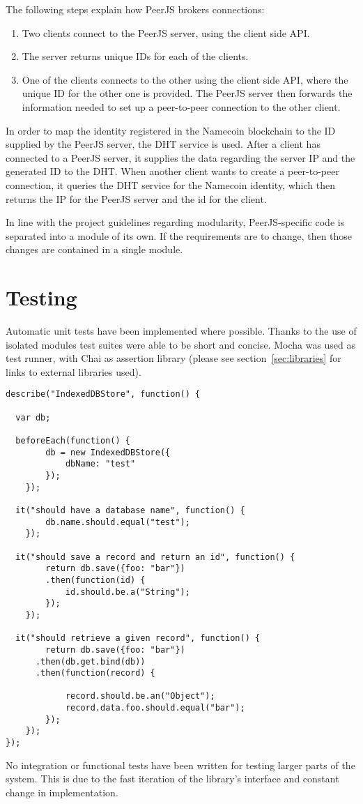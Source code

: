 The following steps explain how PeerJS brokers connections:
\begin{enumerate}
\item Two clients connect to the PeerJS server, using the client side API.
\item The server returns unique IDs for each of the clients.
\item One of the clients connects to the other using the client side API, where the unique ID for the other one is provided. The PeerJS server then forwards the information needed to set up a peer-to-peer connection to the other client.
\end{enumerate}

In order to map the identity registered in the Namecoin blockchain to the ID supplied by the PeerJS server, the DHT service is used. After a client has connected to a PeerJS server, it supplies the data regarding the server IP and the generated ID to the DHT. When another client wants to create a peer-to-peer connection, it queries the DHT service for the Namecoin identity, which then returns the IP for the PeerJS server and the id for the client.

In line with the project guidelines regarding modularity, PeerJS-specific code is separated into a module of its own. If the requirements are to change, then those changes are contained in a single module.



\section{Testing}
\label{sec:testing}
Automatic unit tests have been implemented where possible. Thanks to the use of isolated modules test suites were able to be short and concise. Mocha was used as test runner, with Chai as assertion library (please see section~\ref{sec:libraries} for links to external libraries used).

\begin{Code}
\begin{lstlisting}[caption={Sample test suite}, label={lst:testsuite}]
describe("IndexedDBStore", function() {

  var db;

  beforeEach(function() {
		db = new IndexedDBStore({
			dbName: "test"
		});
	});

  it("should have a database name", function() {
		db.name.should.equal("test");
	});

  it("should save a record and return an id", function() {
		return db.save({foo: "bar"})
		.then(function(id) {
			id.should.be.a("String");
		});
	});

  it("should retrieve a given record", function() {
		return db.save({foo: "bar"})
      .then(db.get.bind(db))
      .then(function(record) {

			record.should.be.an("Object");
			record.data.foo.should.equal("bar");
		});
	});
});
\end{lstlisting}
\end{Code}

No integration or functional tests have been written for testing larger parts of the system. This is due to the fast iteration of the library's interface and constant change in implementation.
